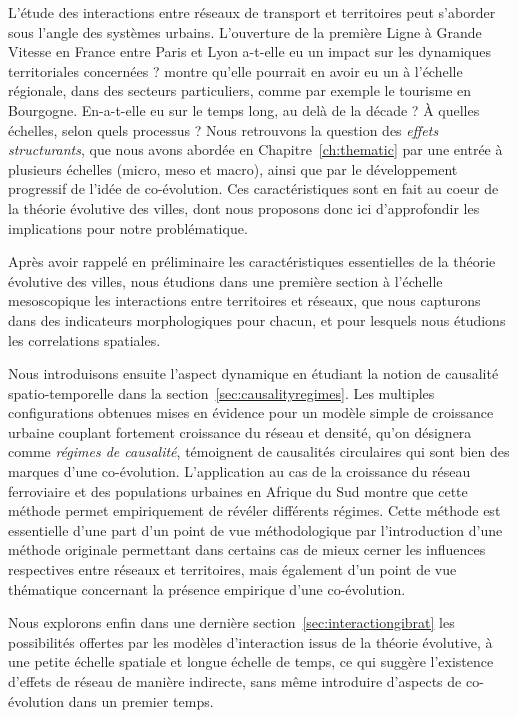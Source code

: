 L'étude des interactions entre réseaux de transport et territoires peut s'aborder sous l'angle des systèmes urbains. L'ouverture de la première Ligne à Grande Vitesse en France entre Paris et Lyon a-t-elle eu un impact sur les dynamiques territoriales concernées ? \cite{bonnafous1987regional} montre qu'elle pourrait en avoir eu un à l'échelle régionale, dans des secteurs particuliers, comme par exemple le tourisme en Bourgogne. En-a-t-elle eu sur le temps long, au delà de la décade ? À quelles échelles, selon quels processus ? Nous retrouvons la question des \emph{effets structurants}, que nous avons abordée en Chapitre~\ref{ch:thematic} par une entrée à plusieurs échelles (micro, meso et macro), ainsi que par le développement progressif de l'idée de co-évolution. Ces caractéristiques sont en fait au coeur de la théorie évolutive des villes, dont nous proposons donc ici d'approfondir les implications pour notre problématique.



Après avoir rappelé en préliminaire les caractéristiques essentielles de la théorie évolutive des villes, nous étudions dans une première section à l'échelle mesoscopique les interactions entre territoires et réseaux, que nous capturons dans des indicateurs morphologiques pour chacun, et pour lesquels nous étudions les correlations spatiales.

Nous introduisons ensuite l'aspect dynamique en étudiant la notion de causalité spatio-temporelle dans la section~\ref{sec:causalityregimes}. Les multiples configurations obtenues mises en évidence pour un modèle simple de croissance urbaine couplant fortement croissance du réseau et densité, qu'on désignera comme \emph{régimes de causalité}, témoignent de causalités circulaires qui sont bien des marques d'une co-évolution. L'application au cas de la croissance du réseau ferroviaire et des populations urbaines en Afrique du Sud montre que cette méthode permet empiriquement de révéler différents régimes. Cette méthode est essentielle d'une part d'un point de vue méthodologique par l'introduction d'une méthode originale permettant dans certains cas de mieux cerner les influences respectives entre réseaux et territoires, mais également d'un point de vue thématique concernant la présence empirique d'une co-évolution.


Nous explorons enfin dans une dernière section~\ref{sec:interactiongibrat} les possibilités offertes par les modèles d'interaction issus de la théorie évolutive, à une petite échelle spatiale et longue échelle de temps, ce qui suggère l'existence d'effets de réseau de manière indirecte, sans même introduire d'aspects de co-évolution dans un premier temps.


